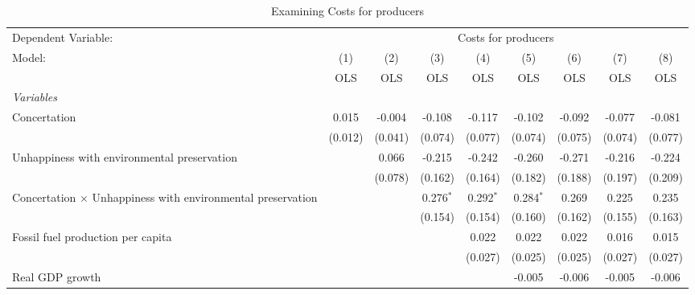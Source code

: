 
\begin{table}[htbp]
   \caption{Examining Costs for producers}
   \centering
   \begin{tabular}{lcccccccc}
      \toprule
      Dependent Variable: & \multicolumn{8}{c}{Costs for producers}\\
      Model:                                                             & (1)     & (2)     & (3)         & (4)         & (5)         & (6)     & (7)           & (8)\\  
                                                                         &  OLS    & OLS     & OLS         & OLS         & OLS         & OLS     & OLS           & OLS\\  
      \midrule
      \emph{Variables}\\
      Concertation                                                       & 0.015   & -0.004  & -0.108      & -0.117      & -0.102      & -0.092  & -0.077        & -0.081\\   
                                                                         & (0.012) & (0.041) & (0.074)     & (0.077)     & (0.074)     & (0.075) & (0.074)       & (0.077)\\   
      Unhappiness with environmental preservation                        &         & 0.066   & -0.215      & -0.242      & -0.260      & -0.271  & -0.216        & -0.224\\   
                                                                         &         & (0.078) & (0.162)     & (0.164)     & (0.182)     & (0.188) & (0.197)       & (0.209)\\   
      Concertation $\times$ Unhappiness with environmental preservation  &         &         & 0.276$^{*}$ & 0.292$^{*}$ & 0.284$^{*}$ & 0.269   & 0.225         & 0.235\\   
                                                                         &         &         & (0.154)     & (0.154)     & (0.160)     & (0.162) & (0.155)       & (0.163)\\   
      Fossil fuel production per capita                                  &         &         &             & 0.022       & 0.022       & 0.022   & 0.016         & 0.015\\   
                                                                         &         &         &             & (0.027)     & (0.025)     & (0.025) & (0.027)       & (0.027)\\   
      Real GDP growth                                                    &         &         &             &             & -0.005      & -0.006  & -0.005        & -0.006\\   

\end{tabular}
\end{table}
